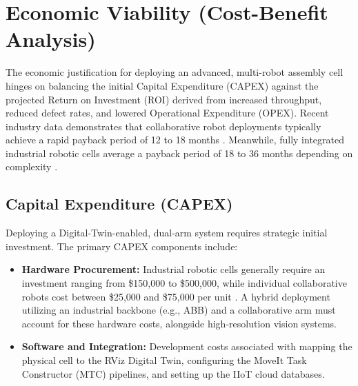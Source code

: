 \section{Economic Viability (Cost-Benefit Analysis)}

The economic justification for deploying an advanced, multi-robot assembly cell hinges on balancing the initial Capital Expenditure (CAPEX) against the projected Return on Investment (ROI) derived from increased throughput, reduced defect rates, and lowered Operational Expenditure (OPEX). Recent industry data demonstrates that collaborative robot deployments typically achieve a rapid payback period of 12 to 18 months \cite{ifactory2026calculator, mantec2026cobot}. Meanwhile, fully integrated industrial robotic cells average a payback period of 18 to 36 months depending on complexity \cite{oxmaint2026roi}.

\subsection{Capital Expenditure (CAPEX)}
Deploying a Digital-Twin-enabled, dual-arm system requires strategic initial investment. The primary CAPEX components include:
\begin{itemize}
    \item \textbf{Hardware Procurement:} Industrial robotic cells generally require an investment ranging from \$150,000 to \$500,000, while individual collaborative robots cost between \$25,000 and \$75,000 per unit \cite{szghtech2026cobot}. A hybrid deployment utilizing an industrial backbone (e.g., ABB) and a collaborative arm must account for these hardware costs, alongside high-resolution vision systems.
    \item \textbf{Software and Integration:} Development costs associated with mapping the physical cell to the RViz Digital Twin, configuring the MoveIt Task Constructor (MTC) pipelines, and setting up the IIoT cloud databases.
\end{itemize}

